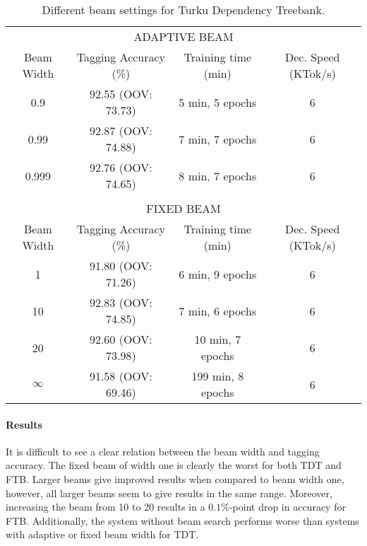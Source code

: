 \begin{table}[htb!]
\begin{center}
\begin{tabular}{c|c|c|c}
\multicolumn{4}{c}{{\small\uppercase{Adaptive Beam}}}\\
\noalign{\smallskip}
\hline
Beam Width & Tagging Accuracy (\%) & Training time (min) & Dec. Speed (KTok/s)\\
\hline
0.9\phantom{99}       & 92.55 (OOV: 73.73)           & 5 min, 5 epochs           & 6            \\
0.99\phantom{9}       & 92.87 (OOV: 74.88)           & 7 min, 7 epochs            & 6            \\
0.999       & 92.76 (OOV: 74.65)            & 8 min, 7 epochs            & 6            \\
\multicolumn{4}{c}{ }\\%
\multicolumn{4}{c}{{\small\uppercase{Fixed Beam}}}\\
\noalign{\smallskip}
\hline
Beam Width & Tagging Accuracy (\%) & Training time (min) & Dec. Speed (KTok/s) \\
\hline
1\phantom{0}        & 91.80 (OOV: 71.26)           & 6 min, 9 epochs            & 6            \\
10       & 92.83 (OOV: 74.85)           &  7 min, 6 epochs           & 6            \\
20       & 92.60 (OOV: 73.98)           & 10 min, 7 epochs            & 6            \\
$\infty$       & 91.58  (OOV: 69.46)          & 199 min, 8 epochs            & 6            \\
\end{tabular}
\caption{Different beam settings for Turku Dependency Treebank.}
\end{center}
\end{table}


\paragraph{Results} It is difficult to see a clear relation between
the beam width and tagging accuracy. The fixed beam of width one is
clearly the worst for both TDT and FTB. Larger beams give improved
results when compared to beam width one, however, all larger beams seem
to give results in the same range. Moreover, increasing the beam from
10 to 20 results in a $0.1\%$-point drop in accuracy for
FTB. Additionally, the system without beam search performs worse
than systems with adaptive or fixed beam width for TDT.

